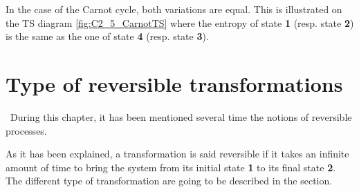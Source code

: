 In the case of the Carnot cycle, both variations are equal. This is illustrated on the TS diagram \ref{fig:C2_5_CarnotTS} where the entropy of state \textbf{1} (resp. state \textbf{2}) is the same as the one of state \textbf{4} (resp. state \textbf{3}).

\section{Type of reversible transformations}
\quad\ During this chapter, it has been mentioned several time the notions of reversible processes. 

As it has been explained, a transformation is said reversible if it takes an infinite amount of time to bring the system from its initial state \textbf{1} to its final state \textbf{2}. The different type of transformation are going to be described in the section.

